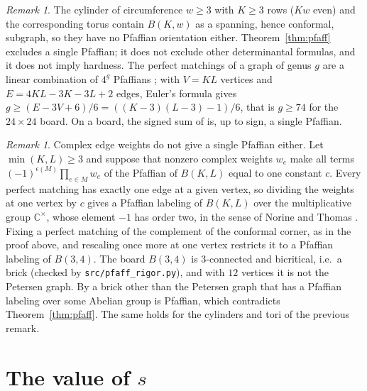\documentclass[11pt]{amsart}
\theoremstyle{definition}
\theoremstyle{remark}
\newtheorem{remark}[theorem]{Remark}
\newcommand{\file}[1]{\texttt{#1}}
\begin{document}
\begin{remark}
The cylinder of circumference $w \ge 3$ with $K \ge 3$ rows ($Kw$ even) and the corresponding
torus contain $B(K, w)$ as a spanning, hence conformal, subgraph, so they have no Pfaffian
orientation either. Theorem~\ref{thm:pfaff} excludes a single Pfaffian; it does not exclude
other determinantal formulas, and it does not imply hardness. The perfect matchings of a graph
of genus $g$ are a linear combination of $4^g$ Pfaffians \cite{galluccioloebl1999,tesler2000};
with $V = KL$ vertices and $E = 4KL - 3K - 3L + 2$ edges, Euler's formula gives
$g \ge (E - 3V + 6)/6 = ((K-3)(L-3) - 1)/6$, that is $g \ge 74$ for the $24 \times 24$ board. On a
board, the signed sum of \cite{wildeboerseidel2020} is, up to sign, a single Pfaffian.
\end{remark}

\begin{remark}
Complex edge weights do not give a single Pfaffian either. Let $\min(K, L) \ge 3$ and suppose that
nonzero complex weights $w_e$ make all terms $(-1)^{\epsilon(M)} \prod_{e \in M} w_e$ of the
Pfaffian of $B(K, L)$ equal to one constant $c$. Every perfect matching has exactly one edge at a
given vertex, so dividing the weights at one vertex by $c$ gives a Pfaffian labeling of $B(K, L)$
over the multiplicative group $\mathbb{C}^{\times}$, whose element $-1$ has order two, in the sense of
Norine and Thomas \cite{norinethomas2008}. Fixing a perfect matching of the complement of the
conformal corner, as in the proof above, and rescaling once more at one vertex restricts it to a
Pfaffian labeling of $B(3, 4)$. The board $B(3, 4)$ is $3$-connected and bicritical, i.e.\ a brick
(checked by \file{src/pfaff\_rigor.py}), and with $12$ vertices it is not the Petersen graph. By
\cite[Lemma~3.5]{norinethomas2008} a brick other than the Petersen graph that has a Pfaffian
labeling over some Abelian group is Pfaffian, which contradicts Theorem~\ref{thm:pfaff}. The same
holds for the cylinders and tori of the previous remark.
\end{remark}

\section{The value of \texorpdfstring{$s$}{s}}\label{sec:value}
\end{document}
